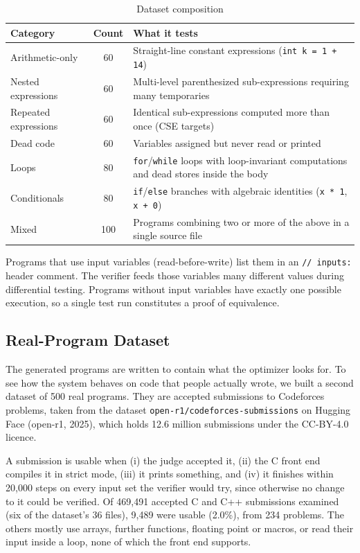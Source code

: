\documentclass[12pt,a4paper]{report}
\begin{document}
\begin{table}[H]
\centering
\caption{Dataset composition}
\label{tab:dataset}
\begin{tabularx}{\textwidth}{|l|c|X|}
\hline
\textbf{Category} & \textbf{Count} & \textbf{What it tests} \\
\hline
Arithmetic-only & 60 & Straight-line constant expressions (\texttt{int k = 1 + 14}) \\
\hline
Nested expressions & 60 & Multi-level parenthesized sub-expressions requiring many temporaries \\
\hline
Repeated expressions & 60 & Identical sub-expressions computed more than once (CSE targets) \\
\hline
Dead code & 60 & Variables assigned but never read or printed \\
\hline
Loops & 80 & \texttt{for}/\texttt{while} loops with loop-invariant computations and dead stores inside the body \\
\hline
Conditionals & 80 & \texttt{if}/\texttt{else} branches with algebraic identities (\texttt{x * 1}, \texttt{x + 0}) \\
\hline
Mixed & 100 & Programs combining two or more of the above in a single source file \\
\hline
\end{tabularx}
\end{table}

Programs that use input variables (read-before-write) list them in an \texttt{// inputs:} header comment. The verifier feeds those variables many different values during differential testing. Programs without input variables have exactly one possible execution, so a single test run constitutes a proof of equivalence.

\subsection{Real-Program Dataset}
\label{sec:realdata}

The generated programs are written to contain what the optimizer looks for. To see how the system behaves on code that people actually wrote, we built a second dataset of 500 real programs. They are accepted submissions to Codeforces problems, taken from the dataset \texttt{open-r1/codeforces-submissions} on Hugging Face (open-r1, 2025), which holds 12.6 million submissions under the CC-BY-4.0 licence.

A submission is usable when (i) the judge accepted it, (ii) the C front end compiles it in strict mode, (iii) it prints something, and (iv) it finishes within 20,000 steps on every input set the verifier would try, since otherwise no change to it could be verified. Of 469,491 accepted C and C++ submissions examined (six of the dataset's 36 files), 9,489 were usable (2.0\%), from 234 problems. The others mostly use arrays, further functions, floating point or macros, or read their input inside a loop, none of which the front end supports.
\end{document}
